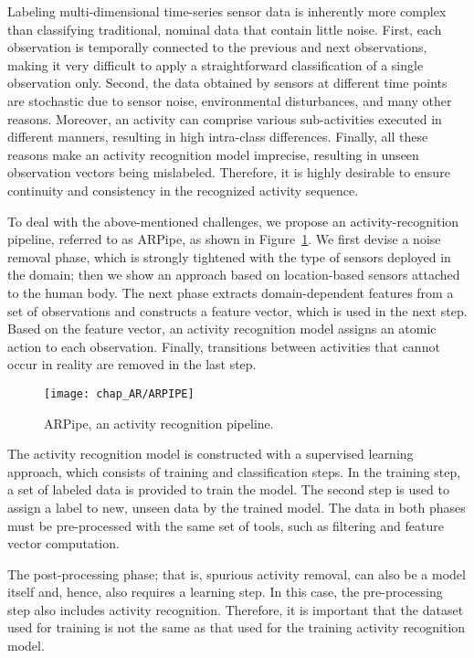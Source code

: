 Labeling multi-dimensional time-series sensor data is inherently more complex than classifying traditional, nominal data that contain little noise. First, each observation is temporally connected to the previous and next observations, making it very difficult to apply a straightforward classification of a single observation only. Second, the data obtained by sensors at different time points are stochastic due to sensor noise, environmental disturbances, and many other reasons. Moreover, an activity can comprise various sub-activities executed in different manners, resulting in high intra-class differences. Finally, all these reasons make an activity recognition model imprecise, resulting in unseen observation vectors being mislabeled. Therefore, it is highly desirable to ensure continuity and consistency in the recognized activity sequence.

To deal with the above-mentioned challenges, we propose an activity-recognition pipeline, referred to as ARPipe, as shown in Figure~\ref{fig:ar:pipeline}. We first devise a noise removal phase, which is strongly tightened with the type of sensors deployed in the domain; then we show an approach based on location-based sensors attached to the human body. The next phase extracts domain-dependent features from a set of observations and constructs a feature vector, which is used in the next step. Based on the feature vector, an activity recognition model assigns an atomic action to each observation. Finally, transitions between activities that cannot occur in reality are removed in the last step.

\begin{figure}[!ht]
\centering
\texttt{[image: chap\_AR/ARPIPE]}
\caption{ARPipe, an activity recognition pipeline.}
\label{fig:ar:pipeline}
\end{figure}

The activity recognition model is constructed with a supervised learning approach, which consists of training and classification steps. In the training step, a set of labeled data is provided to train the model. The second step is used to assign a label to new, unseen data by the trained model. The data in both phases must be pre-processed with the same set of tools, such as filtering and feature vector computation. 

The post-processing phase; that is, spurious activity removal, can also be a model itself and, hence, also requires a learning step. In this case, the pre-processing step also includes activity recognition. Therefore, it is important that the dataset used for training is not the same as that used for the training activity recognition model.


